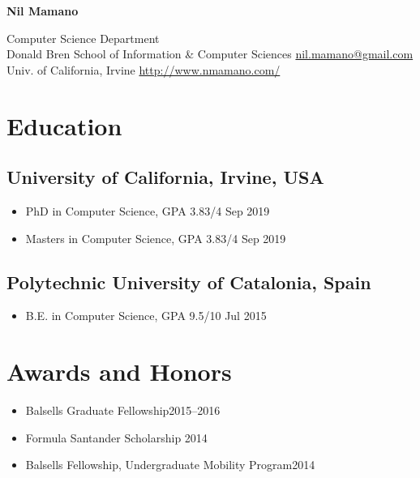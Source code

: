 \documentclass[letterpaper,10pt,oneside]{article}
\begin{document}
\begin{center}
\LARGE{\textbf{Nil Mamano}}\\
\end{center}
\vspace{-2ex}
\hrulefill
\normalsize
\vspace{1em}

\noindent Computer Science Department \hfill \\
\noindent Donald Bren School of Information \& Computer Sciences \hfill\href{mailto:nil.mamano@gmail.com}{nil.mamano@gmail.com} \\
\noindent Univ. of California, Irvine \hfill\href{http://www.nmamano.com}{http://www.nmamano.com/}


\section*{Education}
\subsection*{University of California, Irvine, USA}
\begin{itemize}
    \item PhD in Computer Science, GPA 3.83/4 \hfill Sep 2019
    \item Masters in Computer Science, GPA 3.83/4 \hfill Sep 2019
\end{itemize}
\subsection*{Polytechnic University of Catalonia, Spain}
\begin{itemize}
    \item B.E. in Computer Science, GPA 9.5/10 \hfill Jul 2015
\end{itemize}

\section*{Awards and Honors}
\begin{itemize}
	\item Balsells Graduate Fellowship\hfill 2015--2016
	\item Formula Santander Scholarship \hfill 2014
	\item Balsells Fellowship, Undergraduate Mobility Program\hfill 2014
\end{itemize}
\end{document}

